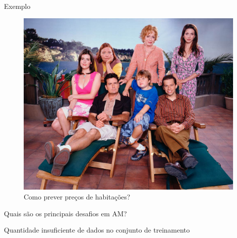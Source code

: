 \documentclass[12pt,mathserif,aspectratio=169]{beamer}
\begin{document}
\begin{frame}{Exemplo}
    \begin{figure}
	    \includegraphics[width=0.45\paperwidth]{fig/taahm.jpg}
	    \caption{Como prever preços de habitações?}
    \end{figure}
\end{frame}

\begin{frame}
    \Huge Quais são os principais desafios em AM?
\end{frame}

\begin{frame}
    \Huge Quantidade insuficiente de dados no conjunto de treinamento
\end{frame}
\end{document}
